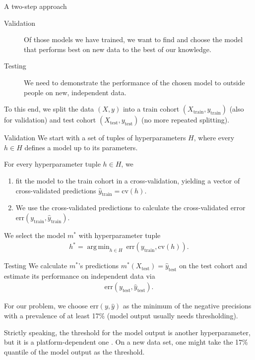 \documentclass[10pt, aspectratio=169]{beamer}
\DeclareMathOperator*{\argmin}{arg\,min}
\begin{document}
\begin{frame}{A two-step approach}
  \begin{description}
    \item[Validation] Of those models we have trained, we want to find and choose
       the model that performs best on new data to the best of \alert{our} knowledge.
    \item[Testing] We need to demonstrate the performance of the chosen model to 
      \alert{outside} people on new, independent data.
  \end{description}

  \pause
  To this end, we split the data $(X, y)$ into a train cohort 
  $(X_{\text{train}}, y_{\text{train}})$ (also for validation) and test 
  cohort $(X_{\text{test}}, y_{\text{test}})$ (no more repeated splitting).
\end{frame}

\begin{frame}{Validation}
  We start with a set of tuples of hyperparameters $H$, where every $h \in H$ 
  defines a model up to its parameters.

  For every hyperparameter tuple $h \in H$, we
  \pause

  \begin{enumerate}
    \item fit the model to the train cohort 
    in a cross-validation, yielding a vector of cross-validated predictions 
    $\hat{y}_\text{train} = \text{cv}(h)$.
    \pause
    \item We use the cross-validated predictions to calculate the 
      cross-validated error $\text{err}(y_{\text{train}}, \hat{y}_\text{train})$.
  \end{enumerate}

  We select the model $m^*$ with hyperparameter tuple
  \begin{align*}
    h^* = \argmin_{h \in H} \ \text{err}(y_\text{train}, \text{cv}(h)).
  \end{align*}
\end{frame}

\begin{frame}{Testing}
  We calculate $m^*$'s predictions $m^*(X_\text{test}) = \hat{y}_{\text{test}}$ 
  on the test cohort and estimate its performance on independent data via
  \begin{align*}
    \text{err}(y_{\text{test}}, \hat{y}_{\text{test}}).
  \end{align*}

  \pause
  For our problem, we choose $\text{err}(y, \hat{y})$ as the minimum of the 
  negative precisions with a prevalence of at least 17\% (model output usually 
  needs thresholding).

  \pause
  Strictly speaking, the threshold for the model output is another hyperparameter, 
  but it is a platform-dependent one \citep{transplatform17}. On a new data set, 
  one might take the 17\% quantile of the model output as the threshold.
\end{frame}
\end{document}
